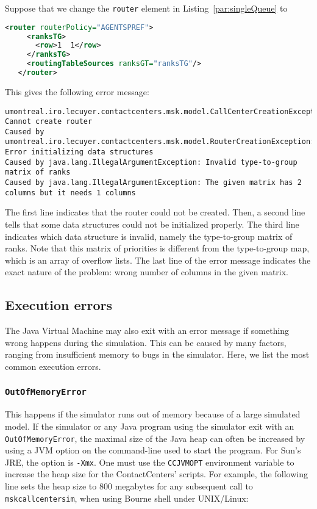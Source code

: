 Suppose that we change the \texttt{router} element in
Listing~\ref{par:singleQueue}
to
\begin{lstlisting}[language=XML]
   <router routerPolicy="AGENTSPREF">
     <ranksTG>
       <row>1  1</row>
     </ranksTG>
     <routingTableSources ranksGT="ranksTG"/>
   </router>
\end{lstlisting}
This gives the following error message:
\begin{lstlisting}[language={},breaklines,prebreak={\char92}]
umontreal.iro.lecuyer.contactcenters.msk.model.CallCenterCreationException: Cannot create router
Caused by umontreal.iro.lecuyer.contactcenters.msk.model.RouterCreationException: Error initializing data structures
Caused by java.lang.IllegalArgumentException: Invalid type-to-group matrix of ranks
Caused by java.lang.IllegalArgumentException: The given matrix has 2 columns but it needs 1 columns
\end{lstlisting}
The first line indicates that the router could not be created.
Then, a second line tells that some data structures could not be
initialized properly.
The third line indicates which data structure is invalid, namely the
type-to-group matrix of ranks.
Note that this matrix of priorities is different from the
type-to-group map, which is an array of overflow lists.
The last line of the error message indicates the exact nature of the
problem: wrong number of columns in the given matrix.

\subsection{Execution errors}
\label{sec:exerr}

The Java Virtual Machine may also exit with an error message if
something wrong happens during the simulation.
This can be caused by many factors, ranging from insufficient memory
to bugs in the simulator.
Here, we list the most common execution errors.

\subsubsection{\texttt{OutOfMemoryError}}

This happens if the simulator runs out of memory because of a large
simulated model.
If the simulator or any Java program using the simulator
exit with an \texttt{Out\-Of\-Memory\-Error}, the
maximal size of the Java heap can often be increased by using a JVM
option on the command-line used to start the program.  For Sun's JRE,
the option is \texttt{-Xmx}.  One must use the \texttt{CCJVMOPT}
environment variable to increase the heap size for the ContactCenters'
scripts.
For example, the following line sets the heap size to 800 megabytes
for any subsequent call to \texttt{mskcallcentersim}, when
using Bourne shell under UNIX/Linux:

